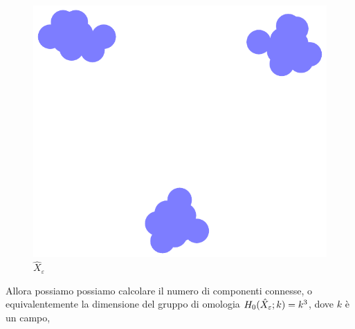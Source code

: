 \begin{figure}
  \begin{center}
    \includegraphics[width=.4\linewidth]{gfx/three_clusters_fat.pdf}
    \caption{$\hat{X}_\varepsilon$}
    \label{fig:clusters_fat}
  \end{center}
\end{figure}

Allora possiamo possiamo calcolare il numero di componenti connesse, o equivalentemente la dimensione del gruppo di omologia $H_{0}(\hat{X}_\varepsilon;k)=k^3$, dove $k$ è un campo,
